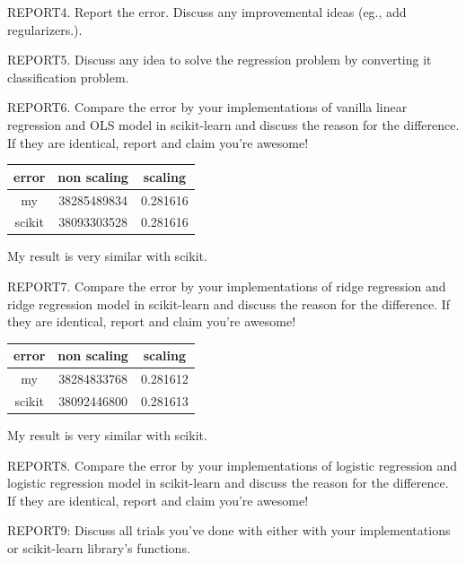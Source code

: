 \documentclass[a4 paper]{article}
\numberwithin{equation}{section}
\newcommand{\0}{\mathbf{0}}
\begin{document}
REPORT4. Report the error. Discuss any improvemental ideas (eg., add regularizers.).

REPORT5. Discuss any idea to solve the regression problem by converting it classification problem.

REPORT6. Compare the error by your implementations of vanilla linear regression and OLS model in scikit-learn and discuss the reason for the difference. If they are identical, report and claim you're awesome! \\
\begin{table}[h]
\begin{tabular}{|c|c|c|}
\hline
error       & non scaling & scaling     \\ \hline
my          & 38285489834 & 0.281616 \\ \hline
scikit      & 38093303528 & 0.281616 \\ \hline
\end{tabular}
\end{table}
My result is very similar with scikit.

REPORT7. Compare the error by your implementations of ridge regression and ridge regression model in scikit-learn and discuss the reason for the difference. If they are identical, report and claim you're awesome! \\
\begin{table}[h]
\begin{tabular}{|c|c|c|}
\hline
error       & non scaling & scaling     \\ \hline
my          & 38284833768 & 0.281612 \\ \hline
scikit      & 38092446800 & 0.281613 \\ \hline
\end{tabular}
\end{table}
My result is very similar with scikit.

REPORT8. Compare the error by your implementations of logistic regression and logistic regression model in scikit-learn and discuss the reason for the difference. If they are identical, report and claim you're awesome!

REPORT9: Discuss all trials you've done with either with your implementations or scikit-learn library's functions.
\end{document}
